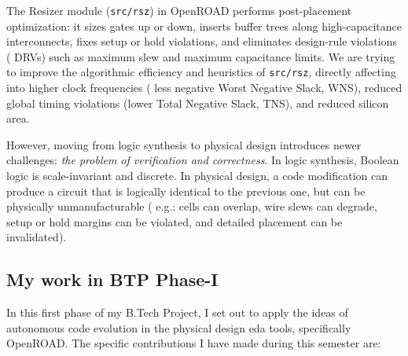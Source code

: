 \documentclass[10pt, conference]{IEEEtran}
\begin{document}
The Resizer module (\texttt{src/rsz}) in OpenROAD performs post-placement optimization: it sizes gates up or down, inserts buffer trees along high-capacitance interconnects, fixes setup or hold violations, and eliminates design-rule violations ( DRVs) such as maximum slew and maximum capacitance limits. We are trying to improve the algorithmic efficiency and heuristics of \texttt{src/rsz}, directly affecting into higher clock frequencies ( less negative Worst Negative Slack, WNS), reduced global timing violations (lower Total Negative Slack, TNS), and reduced silicon area.

However, moving from logic synthesis to physical design introduces newer challenges: \emph{the problem of verification and correctness}. In logic synthesis, Boolean logic is scale-invariant and discrete. In physical design, a code modification can produce a circuit that is logically identical to the previous one, but can be physically unmanufacturable ( e.g.: cells can overlap, wire slews can degrade, setup or hold margins can be violated, and detailed placement can be invalidated).

\subsection{My work in BTP Phase-I}

In this first phase of my B.Tech Project, I set out to apply the ideas of autonomous code evolution in the physical design eda tools, specifically OpenROAD. The specific contributions I have made during this semester are:
\end{document}
